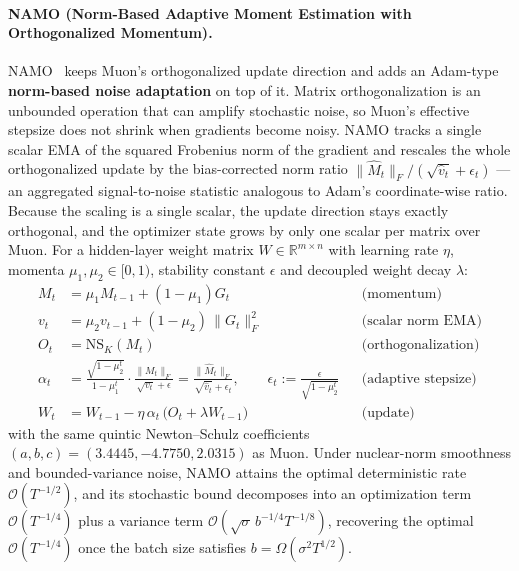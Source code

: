 \paragraph{NAMO (Norm-Based Adaptive Moment Estimation with Orthogonalized Momentum).}
NAMO~\citep{zhang_namo_2026} keeps Muon's orthogonalized update direction and adds an
Adam-type \textbf{norm-based noise adaptation} on top of it. Matrix orthogonalization is
an unbounded operation that can amplify stochastic noise, so Muon's effective stepsize
does not shrink when gradients become noisy. NAMO tracks a single scalar EMA of the
squared Frobenius norm of the gradient and rescales the whole orthogonalized update by
the bias-corrected norm ratio $\lVert\widehat M_t\rVert_F/(\sqrt{\widehat v_t}+\epsilon_t)$
--- an aggregated signal-to-noise statistic analogous to Adam's coordinate-wise ratio.
Because the scaling is a single scalar, the update direction stays exactly orthogonal,
and the optimizer state grows by only one scalar per matrix over Muon. For a
hidden-layer weight matrix $W \in \mathbb{R}^{m\times n}$ with learning rate $\eta$,
momenta $\mu_1,\mu_2 \in [0,1)$, stability constant $\epsilon$ and decoupled weight
decay $\lambda$:
\begin{align}
M_t &= \mu_1 M_{t-1} + (1-\mu_1) G_t && \text{(momentum)} \\
v_t &= \mu_2 v_{t-1} + (1-\mu_2)\,\lVert G_t\rVert_F^2 && \text{(scalar norm EMA)} \\
O_t &= \mathrm{NS}_K(M_t) && \text{(orthogonalization)} \\
\alpha_t &= \frac{\sqrt{1-\mu_2^t}}{1-\mu_1^t}\cdot\frac{\lVert M_t\rVert_F}{\sqrt{v_t}+\epsilon}
   = \frac{\lVert\widehat M_t\rVert_F}{\sqrt{\widehat v_t}+\epsilon_t},
   \qquad \epsilon_t := \frac{\epsilon}{\sqrt{1-\mu_2^t}} && \text{(adaptive stepsize)} \\
W_t &= W_{t-1} - \eta\,\alpha_t\,\bigl(O_t + \lambda W_{t-1}\bigr) && \text{(update)}
\end{align}
with the same quintic Newton--Schulz coefficients $(a,b,c)=(3.4445,-4.7750,2.0315)$ as
Muon. Under nuclear-norm smoothness and bounded-variance noise, NAMO attains the optimal
deterministic rate $\mathcal{O}(T^{-1/2})$, and its stochastic bound decomposes into an
optimization term $\mathcal{O}(T^{-1/4})$ plus a variance term
$\mathcal{O}(\sqrt{\sigma}\,b^{-1/4}T^{-1/8})$, recovering the optimal $\mathcal{O}(T^{-1/4})$
once the batch size satisfies $b=\Omega(\sigma^2 T^{1/2})$.

